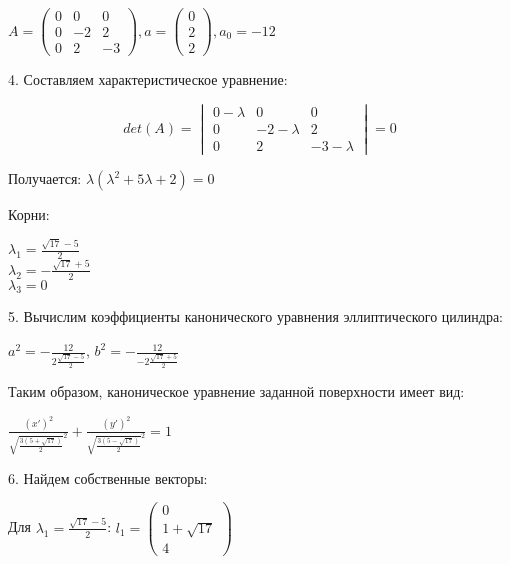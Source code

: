 \begin{center}
	$ A = 
	\begin{pmatrix}
	  0 & 0 & 0\\
	  0 & -2 & 2\\
	  0 & 2 & -3
	\end{pmatrix}
	, a = 
	\begin{pmatrix}
	  0 \\
	  2 \\
	  2 
	\end{pmatrix}
	, a_0 = -12$
\end{center}

4. Составляем характеристическое уравнение:

\begin{center}
	\begin{equation*}
	det(A) = 
	\begin{vmatrix}
	  0-\lambda & 0 & 0\\
	  0 & -2-\lambda & 2\\
	  0 & 2 & -3-\lambda
	\end{vmatrix} = 0
	\end{equation*}
\end{center}

Получается: $\lambda(\lambda^{2}+5\lambda+2) = 0$

Корни:
\begin{center}
	$\lambda_{1} = \frac{\sqrt{17} - 5}{2}$\\
	$\lambda_{2} = -\frac{\sqrt{17} + 5}{2}$\\
	$\lambda_{3} = 0$
\end{center}

5. Вычислим коэффициенты канонического уравнения эллиптического цилиндра:

\begin{center}
	$a^{2} = -\frac{12}{2\frac{\sqrt{17} - 5}{2}}$, 
	$b^{2} = -\frac{12}{-2\frac{\sqrt{17} + 5}{2}}$
\end{center}

Таким образом, каноническое уравнение заданной поверхности имеет вид:

\begin{center}
	$\frac{(x')^{2}}{ \sqrt{\frac{3(5+\sqrt{17})}{2}}^{2} } +
	 \frac{(y')^{2}}{ \sqrt{\frac{3(5-\sqrt{17})}{2}}^{2} } = 1$
\end{center}

6. Найдем собственные векторы:

Для $\lambda_1 = \frac{\sqrt{17} - 5}{2}$: $l_1 = \begin{pmatrix}
	  0 \\
	  1+\sqrt{17} \\
	  4 
	\end{pmatrix}$

